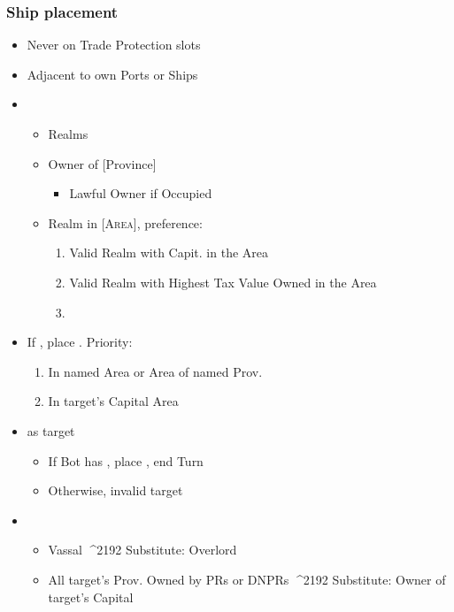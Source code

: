 \documentclass[10pt]{article}
\begin{document}
\subsubsection*{Ship placement}
\begin{itemize}
	\item Never on Trade Protection slots
	\item Adjacent to own Ports or Ships
\end{itemize}

\begin{itemize}
	\item {}
	\begin{itemize}
		\item Realms
		\item \dprime Owner of [Province]\dprime
		\begin{itemize}
			\item Lawful Owner if Occupied
		\end{itemize}
		\item \dprime Realm in [\textsc{Area}]\dprime, preference:
		\begin{enumerate}
			\item Valid Realm with Capit. in the Area
			\item Valid Realm with Highest Tax Value Owned in the Area
			\item \az
		\end{enumerate}
	\end{itemize}
	\item If , place \claim. Priority:
	\begin{enumerate}
		\item In named Area or Area of named Prov.
		\item In target's Capital Area
	\end{enumerate}
	\item {} as target
	\begin{itemize}
		\item If Bot has , place \claim, end Turn
		\item Otherwise, invalid target
	\end{itemize}
	\item {}
	\begin{itemize}
		\item Vassal ^^^^2192 Substitute: Overlord
		\item All target's Prov. Owned by PRs or DNPRs ^^^^2192 Substitute: Owner of target's Capital

\end{itemize}
\end{itemize}
\end{document}
